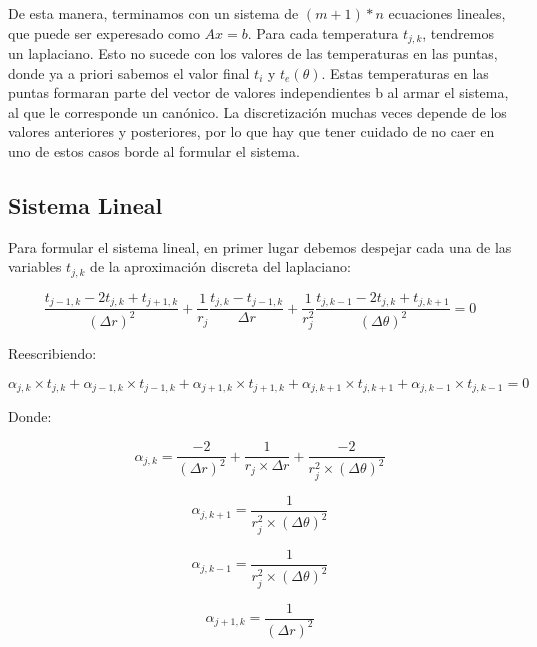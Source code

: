 De esta manera, terminamos con un sistema de $(m+1)*n$ ecuaciones lineales, que puede ser experesado como $Ax = b$. Para cada temperatura $t_{j,k}$, tendremos un laplaciano. Esto no sucede con los valores de las temperaturas en las puntas, donde ya a priori sabemos el valor final $t_i$ y $t_e(\theta)$. Estas temperaturas en las puntas formaran parte del vector de valores independientes b al armar el sistema, al que le corresponde un canónico. La discretización muchas veces depende de los valores anteriores y posteriores, por lo que hay que tener cuidado de no caer en uno de estos casos borde al formular el sistema.

\subsection{Sistema Lineal}
Para formular el sistema lineal, en primer lugar debemos despejar cada una de las variables $t_{j,k}$ de la aproximación discreta del laplaciano:

\begin{equation}\label{calor}
\frac{t_{j-1,k}-2t_{j,k}+t_{j+1,k}}{(\Delta r)^2}
+ \frac{1}{r_j}
\frac{t_{j,k}-t_{j-1,k}}{\Delta r}
+
\frac{1}{r_j^2}
\frac{t_{j,k-1}-2t_{j,k}+t_{j,k+1}}{(\Delta \theta)^2} = 0 \nonumber
\end{equation}

Reescribiendo:

\begin{equation}
\alpha_{j,k} \times t_{j,k} + \alpha_{j-1,k} \times t_{j-1,k} + \alpha_{j+1,k} \times t_{j+1,k} + \alpha_{j,k+1} \times t_{j,k+1} + \alpha_{j,k-1} \times t_{j,k-1} = 0 \nonumber
\end{equation}

Donde:

\begin{equation}
\alpha_{j,k} = \frac{-2}{(\Delta r)^2} + \frac{1}{r_j \times \Delta r} + \frac{-2}{r_j^2 \times (\Delta \theta)^2}
\end{equation}

\begin{equation}
\alpha_{j,k+1} = \frac{1}{r_j^2 \times (\Delta \theta)^2}
\end{equation}

\begin{equation}
\alpha_{j,k-1} = \frac{1}{r_j^2 \times (\Delta \theta)^2}
\end{equation}

\begin{equation}
\alpha_{j+1,k} = \frac{1}{(\Delta r)^2}
\end{equation}

